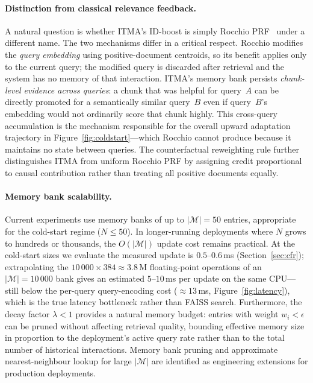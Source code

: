 \documentclass[preprint,12pt]{elsarticle}
\begin{document}
\paragraph{Distinction from classical relevance feedback.}
A natural question is whether ITMA's ID-boost is simply Rocchio
PRF~\citep{rocchio1971relevance} under a different name.  The two mechanisms
differ in a critical respect.  Rocchio modifies the \emph{query embedding}
using positive-document centroids, so its benefit applies only to the current
query; the modified query is discarded after retrieval and the system has no
memory of that interaction.  ITMA's memory bank persists \emph{chunk-level
evidence across queries}: a chunk that was helpful for query~$A$ can be
directly promoted for a semantically similar query~$B$ even if query~$B$'s
embedding would not ordinarily score that chunk highly.  This cross-query
accumulation is the mechanism responsible for the overall upward adaptation
trajectory in Figure~\ref{fig:coldstart}---which Rocchio cannot produce because
it maintains no state between queries.  The counterfactual reweighting rule
further distinguishes ITMA from uniform Rocchio PRF by assigning credit
proportional to causal contribution rather than treating all positive documents
equally.

\paragraph{Memory bank scalability.}
Current experiments use memory banks of up to $|\mathcal{M}|{=}50$ entries,
appropriate for the cold-start regime ($N\leq50$).  In longer-running
deployments where $N$ grows to hundreds or thousands, the $O(|\mathcal{M}|)$
update cost remains practical.  At the cold-start sizes we evaluate the measured
update is $0.5$--$0.6$\,ms (Section~\ref{sec:cfr}); extrapolating the
$10\,000 \times 384 \approx 3.8\,\text{M}$ floating-point operations of an
$|\mathcal{M}|{=}10\,000$ bank gives an estimated $5$--$10$\,ms per update on the
same CPU---still below the per-query query-encoding cost
($\approx13$\,ms, Figure~\ref{fig:latency}), which is the true latency
bottleneck rather than FAISS search.  Furthermore, the decay factor $\lambda<1$ provides
a natural memory budget: entries with weight $w_i < \epsilon$ can be pruned
without affecting retrieval quality, bounding effective memory size in proportion
to the deployment's active query rate rather than to the total number of
historical interactions.  Memory bank pruning and approximate nearest-neighbour
lookup for large $|\mathcal{M}|$ are identified as engineering extensions for
production deployments.
\end{document}
